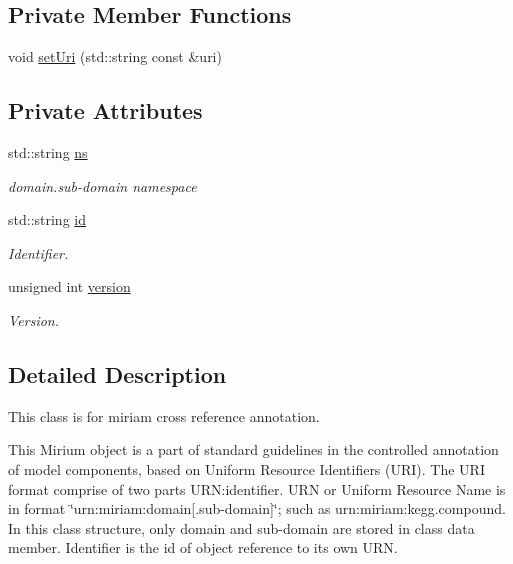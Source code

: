 \subsection*{Private Member Functions}
\begin{DoxyCompactItemize}
\item 
void \hyperlink{classunisys_1_1Miriam_ae5c770e671ddebdf17f1095656c1644e}{set\-Uri} (std\-::string const \&uri)
\end{DoxyCompactItemize}
\subsection*{Private Attributes}
\begin{DoxyCompactItemize}
\item 
std\-::string \hyperlink{classunisys_1_1Miriam_a03b5f4f8523b5910504f6587fbd9cb0a}{ns}
\begin{DoxyCompactList}\small\item\em domain.\-sub-\/domain namespace \end{DoxyCompactList}\item 
std\-::string \hyperlink{classunisys_1_1Miriam_a0f6c60a2c904d9e5b28653464f5867f1}{id}
\begin{DoxyCompactList}\small\item\em Identifier. \end{DoxyCompactList}\item 
unsigned int \hyperlink{classunisys_1_1Miriam_a5dcb23fc55cc7643245087a941321a72}{version}
\begin{DoxyCompactList}\small\item\em Version. \end{DoxyCompactList}\end{DoxyCompactItemize}


\subsection{Detailed Description}
This class is for miriam cross reference annotation. 

This Mirium object is a part of standard guidelines in the controlled annotation of model components, based on Uniform Resource Identifiers (U\-R\-I). The U\-R\-I format comprise of two parts U\-R\-N\-:identifier. U\-R\-N or Uniform Resource Name is in format \char`\"{}urn\-:miriam\-:domain\mbox{[}.\-sub-\/domain\mbox{]}\char`\"{}; such as urn\-:miriam\-:kegg.\-compound. In this class structure, only domain and sub-\/domain are stored in class data member. Identifier is the id of object reference to its own U\-R\-N. 

